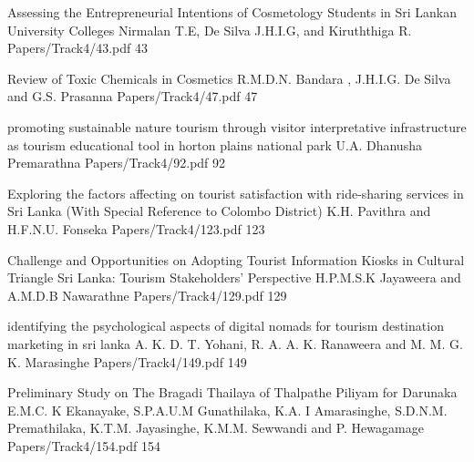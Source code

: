    \addpaper
{Assessing the Entrepreneurial Intentions of Cosmetology Students in Sri Lankan University Colleges}
 {Nirmalan T.E, De Silva J.H.I.G, and Kiruththiga R.} 
 {Papers/Track4/43.pdf}
   {43}

\addpaper
{Review of Toxic Chemicals in Cosmetics}
{R.M.D.N. Bandara , J.H.I.G. De Silva and G.S. Prasanna}
{Papers/Track4/47.pdf}
{47}

\addpaper
{promoting sustainable nature tourism through visitor interpretative infrastructure as tourism educational tool in horton plains national park}
{U.A. Dhanusha Premarathna}
{Papers/Track4/92.pdf}
{92}

\addpaper
{Exploring the factors affecting on tourist satisfaction with ride-sharing services in Sri Lanka (With Special Reference to Colombo District)}
{K.H. Pavithra and H.F.N.U. Fonseka}
{Papers/Track4/123.pdf}
{123}

\addpaper
{Challenge and Opportunities on Adopting Tourist Information Kiosks in Cultural Triangle Sri Lanka: Tourism Stakeholders' Perspective}
{H.P.M.S.K Jayaweera and A.M.D.B Nawarathne}
{Papers/Track4/129.pdf}
{129}

   \addpaper
{identifying the psychological aspects of digital nomads for tourism destination marketing in sri lanka}
 {A. K. D. T. Yohani, R. A. A. K. Ranaweera and M. M. G. K. Marasinghe} 
 {Papers/Track4/149.pdf}
   {149}

\addpaper
{Preliminary Study on The Bragadi Thailaya of Thalpathe Piliyam for Darunaka}
{E.M.C. K Ekanayake, S.P.A.U.M Gunathilaka, K.A. I Amarasinghe, S.D.N.M. Premathilaka, K.T.M. Jayasinghe, K.M.M. Sewwandi and P. Hewagamage}
{Papers/Track4/154.pdf}
{154}